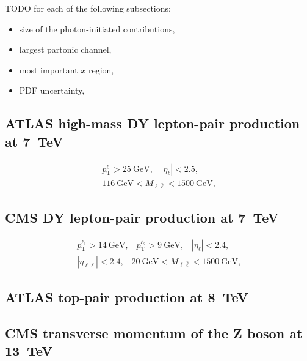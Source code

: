 \noindent
TODO for each of the following subsections:
\begin{itemize}
\item size of the photon-initiated contributions,
\item largest partonic channel,
\item most important $x$ region,
\item PDF uncertainty,
\end{itemize}

\subsection{ATLAS high-mass DY lepton-pair production at \SI{7}{\tera\electronvolt}}
\label{sec:atlas-high-mass-dy}

\begin{equation}
\begin{gathered}
p_\mathrm{T}^\ell > \SI{25}{\giga\electronvolt} \text{,} \quad |\eta_\ell| < 2.5 \text{,} \\
\SI{116}{\giga\electronvolt} < M_{\ell \bar{\ell}} < \SI{1500}{\giga\electronvolt} \text{,}
\end{gathered}
\end{equation}

\subsection{CMS DY lepton-pair production at \SI{7}{\tera\electronvolt}}
\label{sec:cms-dy}

\begin{equation}
\begin{gathered}
p_\mathrm{T}^{\ell_1} > \SI{14}{\giga\electronvolt} \text{,} \quad p_\mathrm{T}^{\ell_2} > \SI{9}{\giga\electronvolt} \text{,} \quad |\eta_\ell| < 2.4 \text{,} \\
|\eta_{\ell \bar{\ell}}| < 2.4 \text{,} \quad \SI{20}{\giga\electronvolt} < M_{\ell \bar{\ell}} < \SI{1500}{\giga\electronvolt} \text{,}
\end{gathered}
\end{equation}

\subsection{ATLAS top-pair production at \SI{8}{\tera\electronvolt}}
\label{sec:atlas-top-pair-production}

\subsection{CMS transverse momentum of the Z boson at \SI{13}{\tera\electronvolt}}
\label{sec:cms-transverse-momentum}

